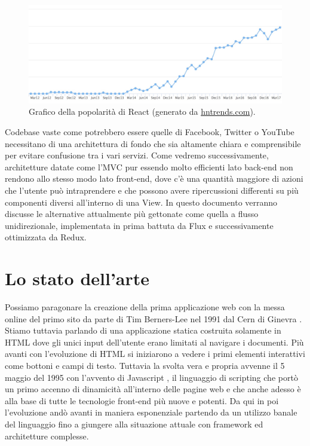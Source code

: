 \begin{figure}[h]
\centering 
\includegraphics[width=12.7cm]{./images/reactPopularity}
\caption{Grafico della popolarità di React (generato da \href{https://www.hntrends.com/}{hntrends.com}).}
\end{figure}

\noindent
Codebase vaste come potrebbero essere quelle di Facebook, Twitter o YouTube necessitano di una architettura di fondo che sia altamente chiara e comprensibile per evitare confusione tra i vari servizi.
Come vedremo successivamente, architetture datate come l'MVC pur essendo molto efficienti lato back-end non rendono allo stesso modo lato front-end, dove c'è una quantità maggiore di azioni che l'utente può intraprendere e che possono avere ripercussioni differenti su più componenti diversi all'interno di una View.
In questo documento verranno discusse le alternative attualmente più gettonate come quella a flusso unidirezionale, implementata in prima battuta da Flux e successivamente ottimizzata da Redux.

\section{Lo stato dell'arte}
Possiamo paragonare la creazione della prima applicazione web con la messa online del primo sito da parte di Tim Berners-Lee nel 1991 dal Cern di Ginevra \cite{HuffingtonpostFirstWebsite}. Stiamo tuttavia parlando di una applicazione statica costruita solamente in HTML dove gli unici input dell'utente erano limitati al navigare i documenti. Più avanti con l'evoluzione di HTML si iniziarono a vedere i primi elementi interattivi come bottoni e campi di testo. Tuttavia la svolta vera e propria avvenne il 5 maggio del 1995 con l'avvento di Javascript \cite{W3cJavascriptHistory}, il linguaggio di scripting che portò un primo accenno di dinamicità all'interno delle pagine web e che anche adesso è alla base di tutte le tecnologie front-end più nuove e potenti. Da qui in poi l'evoluzione andò avanti in maniera esponenziale partendo da un utilizzo banale del linguaggio fino a giungere alla situazione attuale con framework ed architetture complesse.


